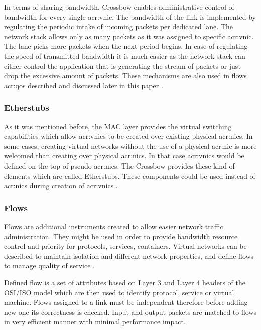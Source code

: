 \documentclass[11pt]{book}
\begin{document}
          In terms of sharing bandwidth, Crossbow enables administrative control of bandwidth for every single
          \gls{acr:vnic}. The bandwidth of the link is implemented by regulating the periodic intake of incoming packets
          per dedicated lane.  The network stack allows only as many packets as it was assigned to specific
          \gls{acr:vnic}. The lane picks more packets when the next period begins. In case of regulating the speed of
          transmitted bandwidth it is much easier as the network stack can either control the application that is
          generating the stream of packets or just drop the excessive amount of packets.  These mechanisms are also used
          in flows \gls{acr:qos} described and discussed later in this paper \cite{crossbow}.


        \subsubsection{Etherstubs}

          As it was mentioned before, the MAC layer provides the virtual switching capabilities which allow
          \gls{acr:vnic}s to be created over existing physical \gls{acr:nic}s.  In some cases, creating virtual networks
          without the use of a physical \gls{acr:nic} is more welcomed than creating over physical \gls{acr:nic}s. In
          that case \gls{acr:vnic}s would be defined on the top of pseudo \gls{acr:nic}s.  The Crossbow provides these
          kind of elements which are called Etherstubs. These components could be used instead of \gls{acr:nic}s during
          creation of \gls{acr:vnic}s \cite{crossbow}.


        \subsubsection{Flows}

          Flows are additional instruments created to allow easier network traffic administration. They might be used in
          order to provide bandwidth resource control and priority for protocols, services, containers. Virtual networks
          can be described to maintain isolation and different network properties, and define flows to manage quality of
          service \cite{network_virtualization}.

          Defined flow is a set of attributes based on Layer 3 and Layer 4 headers of the OSI/ISO model which are then
          used to identify protocol, service or virtual machine.  Flows assigned to a link must be independent therefore
          before adding new one its correctness is checked. Input and output packets are matched to flows in very
          efficient manner with minimal performance impact.
\end{document}
